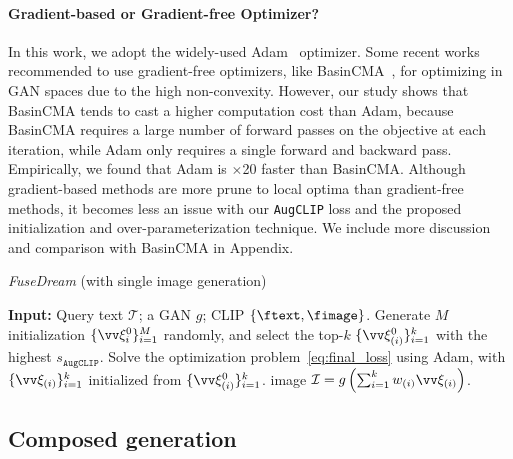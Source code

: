 \documentclass[10pt,twocolumn,letterpaper]{article}
\newcommand{\our}{\emph{FuseDream}}
\newcommand{\ourloss}{\texttt{AugCLIP}}
\begin{document}
\paragraph{Gradient-based or Gradient-free Optimizer?} 
In this work, we adopt the widely-used Adam~\cite{kingma2015adam} optimizer.
Some recent works recommended to use 
gradient-free optimizers, 
like BasinCMA~\cite{wampler2009optimal, bau2019seeing, huh2020transforming}, 
for optimizing in GAN spaces due to the high non-convexity. 
However, our study shows  that BasinCMA 
tends to cast a higher computation cost than Adam,  because  BasinCMA requires  a large number of forward passes 
on the objective at each iteration, while Adam only requires a single forward and backward pass. 
Empirically, we found that Adam is $\times$20 faster than BasinCMA.
Although gradient-based methods 
are more prune to local optima than gradient-free methods, 
it becomes less an issue with our {\ourloss} loss and the proposed initialization and over-parameterization technique. 
We include more discussion and comparison with BasinCMA in  Appendix.



\begin{algorithm}[t]
\caption{{\our} (with single image generation)} 
\label{alg:single}
\begin{algorithmic}[1]
\STATE \textbf{Input:} Query text $\mathcal{T}$; 
a GAN $g$; CLIP $\{\ftext, \fimage\}$.  
\STATE Generate $M$ initialization $\{\vv\xi_i^0\}_{i=1}^M$ randomly, 
and  select the top-$k$  $\{\vv\xi_{(i)}^0\}_{i=1}^k$ with the highest 
 $s_{\ourloss}$. 
\STATE Solve 
the optimization problem~\eqref{eq:final_loss}
using Adam,  with $\{\vv\xi_{(i)}\}_{i=1}^k$ initialized from $\{\vv\xi_{(i)}^0\}_{i=1}^k$. 
\RETURN  image $\mathcal{I} = g\left (\sum_{i=1}^k w_{(i)} \vv\xi_{(i)}\right)$.
\end{algorithmic}
\end{algorithm}

\subsection{ Composed generation} \label{subsec:fusion}
\end{document}
